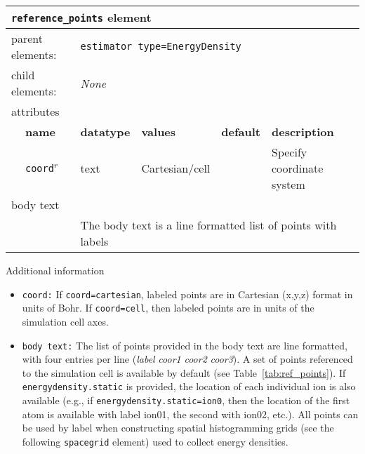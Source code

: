 \FloatBarrier
\begin{table}[h]
\begin{center}
\begin{tabularx}{\textwidth}{l l l l l X }
\hline
\multicolumn{6}{l}{\texttt{reference\_points} element} \\
\hline
\multicolumn{2}{l}{parent elements:} & \multicolumn{4}{l}{\texttt{estimator type=EnergyDensity}}\\
\multicolumn{2}{l}{child  elements:} & \multicolumn{4}{l}{\textit{None}}\\
\multicolumn{2}{l}{attributes}  & \multicolumn{4}{l}{}\\
   &   \bfseries name     & \bfseries datatype & \bfseries values & \bfseries default   & \bfseries description \\
   &   \texttt{coord}$^r$ &  text              & Cartesian/cell   &                     & Specify coordinate system \\
\multicolumn{2}{l}{body text}  & \multicolumn{4}{l}{}\\
   &                           & \multicolumn{4}{l}{The body text is a line formatted list of points with labels}     \\
  \hline
\end{tabularx}
\end{center}
\end{table}
\FloatBarrier

Additional information
\begin{itemize}
  \item{\texttt{coord:} If \texttt{coord=cartesian}, labeled points are in Cartesian (x,y,z) format in units of Bohr.  If \texttt{coord=cell}, then labeled points are in units of the simulation cell axes.}
  \item{\texttt{body text:}  The list of points provided in the body text are line formatted, with four entries per line (\textit{label} \textit{coor1} \textit{coor2} \textit{coor3}}).  A set of points referenced to the simulation cell is available by default (see Table~\ref{tab:ref_points}).  If \texttt{energydensity.static} is provided, the location of each individual ion is also available (e.g., if \texttt{energydensity.static=ion0}, then the location of the first atom is available with label ion01, the second with ion02, etc.). All points can be used by label when constructing spatial histogramming grids (see the following \texttt{spacegrid} element) used to collect energy densities.    
\end{itemize}


